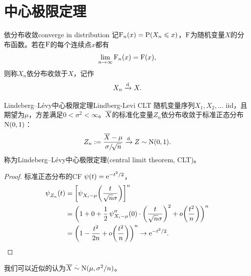 \section{中心极限定理}

\begin{definition}
	{依分布收敛}{converge in distribution}
	记$\operatorname{F}_n(x) = \operatorname{P}(X_n \leqslant x)$，$\operatorname{F}$为随机变量$X$的分布函数。若在$\operatorname{F}$的每个连续点$x$都有
	\begin{equation}\label{eq:ps-convergence-in-distribution}
		\lim_{n\to\infty}\operatorname{F}_n(x) = \operatorname{F}(x),
	\end{equation}
	则称$X_n$依分布收敛于$X$，记作
	\[
		X_n \xrightarrow{\mathrm d} X.
	\]
\end{definition}

\begin{theorem}{Lindeberg--Lévy中心极限定理}{Lindberg-Levi CLT}
	随机变量序列$X_1, X_2,\ldots$ iid，且期望为$\mu$，方差满足$0 < \sigma^2 < \infty$。$\overline{X}$的标准化变量$Z_n$依分布收敛于标准正态分布$\operatorname{N}(0,1)$：
	\begin{equation}
		Z_n := \frac{\avg X - \mu}{\sigma/\!\sqrt n}%
		\dto Z \sim \NormalDist(0,1).
	\end{equation}
	称为Lindeberg--Lévy中心极限定理(central limit theorem, CLT)。
\end{theorem}
\begin{proof}
	标准正态分布的CF $\operatorname{\psi}(t) = \mathop{}\!\mathrm{e}^{-t^2/2}$，%
	\begin{align*}
		\operatorname{\psi}_{Z_n}(t) &= \biggl[\operatorname{\psi}_{X_i-\mu}\biggl(\frac{t}{\sqrt n\sigma}\biggr)\biggr]^n\\
		&= \biggl(1 + 0 + \frac12\operatorname{\psi}''_{X_i-\mu}(0) \cdot \biggl(\frac{t}{\sqrt n\sigma}\biggr)^2 + o\biggl(\frac{t^2}n\biggr)\biggr)^n\\
		&= \biggl(1 - \frac{t^2}{2n} + o\biggl(\frac{t^2}n\biggr)\biggr)^n \to \mathop{}\!\mathrm{e}^{-t^2/2}.
		\qedhere
	\end{align*}
\end{proof}

\begin{corollary}
	我们可以近似的认为$\overline{X} \overset{\cdot}{\sim} \operatorname{N}(\mu,\sigma^2/n)$。
\end{corollary}

